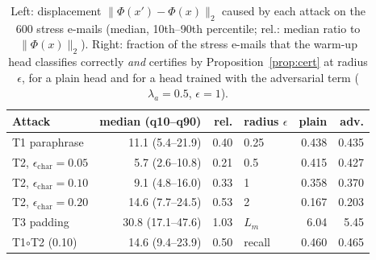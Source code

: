 \begin{table}[t]
\centering
\caption{Left: displacement $\lVert\Phi(x')-\Phi(x)\rVert_2$ caused by each attack on the 600 stress e-mails (median, 10th--90th percentile; rel.: median ratio to $\lVert\Phi(x)\rVert_2$). Right: fraction of the stress e-mails that the warm-up head classifies correctly \emph{and} certifies by Proposition~\ref{prop:cert} at radius $\epsilon$, for a plain head and for a head trained with the adversarial term ($\lambda_a{=}0.5$, $\epsilon{=}1$).}
\label{tab:cert}
\scriptsize
\setlength{\tabcolsep}{2.5pt}
\begin{tabular}{@{}lrr@{\hspace{8pt}}lrr@{}}
\toprule
Attack & median (q10--q90) & rel. & radius $\epsilon$ & plain & adv. \\
\midrule
T1 paraphrase & 11.1 (5.4--21.9) & 0.40 & 0.25 & 0.438 & 0.435 \\
T2, $\epsilon_{\mathrm{char}}{=}0.05$ & 5.7 (2.6--10.8) & 0.21 & 0.5 & 0.415 & 0.427 \\
T2, $\epsilon_{\mathrm{char}}{=}0.10$ & 9.1 (4.8--16.0) & 0.33 & 1 & 0.358 & 0.370 \\
T2, $\epsilon_{\mathrm{char}}{=}0.20$ & 14.6 (7.7--24.5) & 0.53 & 2 & 0.167 & 0.203 \\
T3 padding & 30.8 (17.1--47.6) & 1.03 & $L_m$ & 6.04 & 5.45 \\
T1$\circ$T2 (0.10) & 14.6 (9.4--23.9) & 0.50 & recall & 0.460 & 0.465 \\
\bottomrule
\end{tabular}
\end{table}

